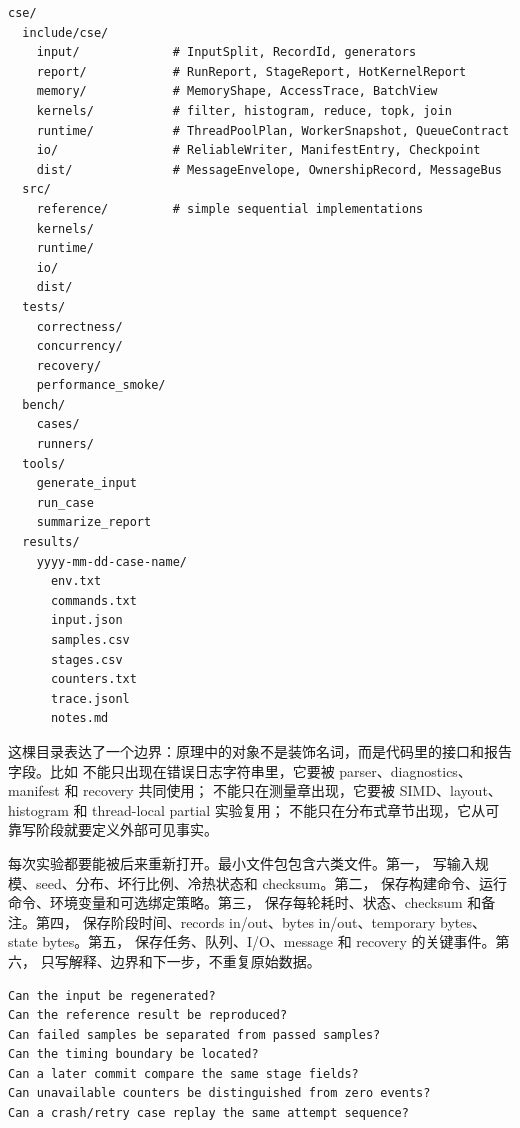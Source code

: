\begin{lstlisting}[language={},caption={Compute Systems Engine 的建议目录形态}]
cse/
  include/cse/
    input/             # InputSplit, RecordId, generators
    report/            # RunReport, StageReport, HotKernelReport
    memory/            # MemoryShape, AccessTrace, BatchView
    kernels/           # filter, histogram, reduce, topk, join
    runtime/           # ThreadPoolPlan, WorkerSnapshot, QueueContract
    io/                # ReliableWriter, ManifestEntry, Checkpoint
    dist/              # MessageEnvelope, OwnershipRecord, MessageBus
  src/
    reference/         # simple sequential implementations
    kernels/
    runtime/
    io/
    dist/
  tests/
    correctness/
    concurrency/
    recovery/
    performance_smoke/
  bench/
    cases/
    runners/
  tools/
    generate_input
    run_case
    summarize_report
  results/
    yyyy-mm-dd-case-name/
      env.txt
      commands.txt
      input.json
      samples.csv
      stages.csv
      counters.txt
      trace.jsonl
      notes.md
\end{lstlisting}

这棵目录表达了一个边界：原理中的对象不是装饰名词，而是代码里的接口和报告字段。比如  不能只出现在错误日志字符串里，它要被 parser、diagnostics、manifest 和 recovery 共同使用； 不能只在测量章出现，它要被 SIMD、layout、histogram 和 thread-local partial 实验复用； 不能只在分布式章节出现，它从可靠写阶段就要定义外部可见事实。

每次实验都要能被后来重新打开。最小文件包包含六类文件。第一， 写输入规模、seed、分布、坏行比例、冷热状态和 checksum。第二， 保存构建命令、运行命令、环境变量和可选绑定策略。第三， 保存每轮耗时、状态、checksum 和备注。第四， 保存阶段时间、records in/out、bytes in/out、temporary bytes、state bytes。第五， 保存任务、队列、I/O、message 和 recovery 的关键事件。第六， 只写解释、边界和下一步，不重复原始数据。

\begin{lstlisting}[numbers=none,caption={一次实验结果必须能回答的问题}]
Can the input be regenerated?
Can the reference result be reproduced?
Can failed samples be separated from passed samples?
Can the timing boundary be located?
Can a later commit compare the same stage fields?
Can unavailable counters be distinguished from zero events?
Can a crash/retry case replay the same attempt sequence?
\end{lstlisting}

